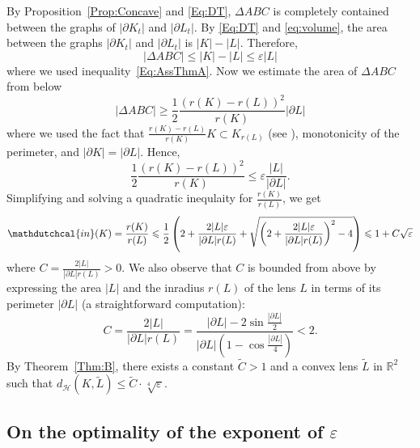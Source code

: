 \documentclass[11pt, oneside]{amsart}
\newcommand{\dH}{d_{\mathcal H}}
\newcommand{\Rr}{\mathdutchcal{in}}
\newcommand{\eps}{\varepsilon}
\renewcommand{\ge}{\geqslant}
\renewcommand{\le}{\leqslant}
\theoremstyle{theorem}
\theoremstyle{Intro}
\theoremstyle{definition}
\theoremstyle{remark}
\theoremstyle{claim}
\numberwithin{equation}{section}
\begin{document}
By Proposition~\ref{Prop:Concave} and \eqref{Eq:DT}, $\Delta ABC$ is completely contained between the graphs of $|\partial K_t|$ and $|\partial L_t|$. By \eqref{Eq:DT} and \eqref{eq:volume}, the area between the graphs $|\partial K_t|$ and $|\partial L_t|$ is $|K|-|L|$.  Therefore, 
\begin{equation}\label{eq:area_upp}
	|\Delta ABC| \le |K| - |L| \le \varepsilon |L| 
\end{equation}
where we used inequality~\eqref{Eq:AssThmA}. Now we estimate the area of $\Delta ABC$ from below 
$$
|\Delta ABC|  \ge  \frac12 \frac{(r(K) - r(L))^2}{r(K)} |
\partial L|
$$
where we used the fact that $\frac{r(K) - r(L)}{r(K)} K \subset K_{r(L)}$ (see \cite[Eq. (2.4)]{HS}), monotonicity of the perimeter, and  $|\partial K| = |\partial L|$. Hence,
$$
 \frac12 \frac{(r(K) - r(L))^2}{r(K)} \le \varepsilon \frac{|L|}{|
\partial L|}.
$$
Simplifying and solving a quadratic inequlaity for $\frac{r(K)}{r(L)}$, we get
\begin{equation}
	\Rr(K) = \frac{r(K)}{r(L)} \le \frac12 \left(2 + \frac{2 |L| \varepsilon}{|\partial L| r(L)} + \sqrt{\left(2 + \frac{2 |L|\varepsilon }{|\partial L| r(L)} \right)^2 - 4} \right) \le 1 + C \sqrt{\varepsilon} 
\end{equation}
where $C = \frac{2 |L|}{|\partial L| r(L)} > 0$. We also observe that $C$ is bounded from above by expressing the area $|L|$ and the inradius $r(L)$ of the lens $L$ in terms of its perimeter $|\partial L|$ (a straightforward computation):
\begin{equation}
\label{Eq:Lens}
C = \frac{2 |L|}{|\partial L| r(L)} = \frac{|\partial L| - 2 \sin \frac{|\partial L|}2}{|\partial L| \left(1 - \cos \frac{|\partial L|}4\right)} < 2.
\end{equation}
By Theorem~\ref{Thm:B}, there exists a constant $\widetilde{C} >1$ and a convex lens $\widetilde{L}$ in $\mathbb{R}^2$ such that $ \dH(K, \widetilde{L}) \le \widetilde{C} \cdot \sqrt[4]{\eps}.$

\subsection{On the optimality of the exponent of $\eps$}
\label{SSec:Optimal}
\end{document}
